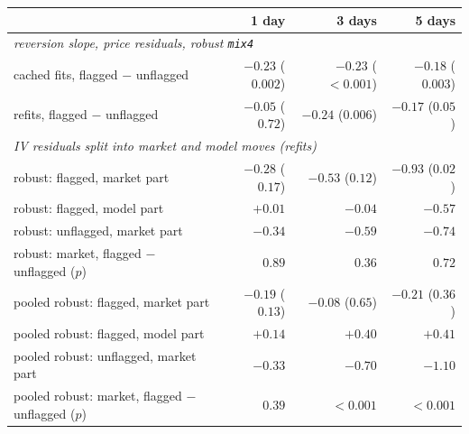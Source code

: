 \begin{tabular}{lrrr}
\toprule
 & 1 day & 3 days & 5 days \\
\midrule
\multicolumn{4}{l}{\emph{reversion slope, price residuals, robust \texttt{mix4}}} \\
cached fits, flagged $-$ unflagged & $-0.23$ ($0.002$) & $-0.23$ ($<0.001$) & $-0.18$ ($0.003$) \\
refits, flagged $-$ unflagged & $-0.05$ ($0.72$) & $-0.24$ ($0.006$) & $-0.17$ ($0.05$) \\
\midrule
\multicolumn{4}{l}{\emph{IV residuals split into market and model moves (refits)}} \\
robust: flagged, market part & $-0.28$ ($0.17$) & $-0.53$ ($0.12$) & $-0.93$ ($0.02$) \\
robust: flagged, model part & $+0.01$ & $-0.04$ & $-0.57$ \\
robust: unflagged, market part & $-0.34$ & $-0.59$ & $-0.74$ \\
robust: market, flagged $-$ unflagged ($p$) & $0.89$ & $0.36$ & $0.72$ \\
pooled robust: flagged, market part & $-0.19$ ($0.13$) & $-0.08$ ($0.65$) & $-0.21$ ($0.36$) \\
pooled robust: flagged, model part & $+0.14$ & $+0.40$ & $+0.41$ \\
pooled robust: unflagged, market part & $-0.33$ & $-0.70$ & $-1.10$ \\
pooled robust: market, flagged $-$ unflagged ($p$) & $0.39$ & $<0.001$ & $<0.001$ \\
\bottomrule
\end{tabular}
